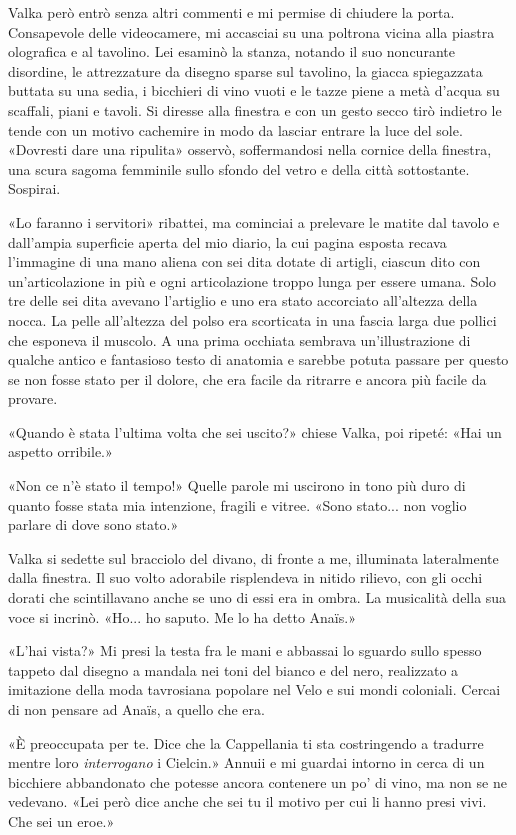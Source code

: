 Valka però entrò senza altri commenti e mi permise di chiudere la porta.
Consapevole delle videocamere, mi accasciai su una poltrona vicina alla
piastra olografica e al tavolino. Lei esaminò la stanza, notando il suo
noncurante disordine, le attrezzature da disegno sparse sul tavolino, la
giacca spiegazzata buttata su una sedia, i bicchieri di vino vuoti e le
tazze piene a metà d'acqua su scaffali, piani e tavoli. Si diresse alla
finestra e con un gesto secco tirò indietro le tende con un motivo
cachemire in modo da lasciar entrare la luce del sole. «Dovresti dare
una ripulita» osservò, soffermandosi nella cornice della finestra, una
scura sagoma femminile sullo sfondo del vetro e della città sottostante.
Sospirai.

«Lo faranno i servitori» ribattei, ma cominciai a prelevare le matite
dal tavolo e dall'ampia superficie aperta del mio diario, la cui pagina
esposta recava l'immagine di una mano aliena con sei dita dotate di
artigli, ciascun dito con un'articolazione in più e ogni articolazione
troppo lunga per essere umana. Solo tre delle sei dita avevano
l'artiglio e uno era stato accorciato all'altezza della nocca. La pelle
all'altezza del polso era scorticata in una fascia larga due pollici che
esponeva il muscolo. A una prima occhiata sembrava un'illustrazione di
qualche antico e fantasioso testo di anatomia e sarebbe potuta passare
per questo se non fosse stato per il dolore, che era facile da ritrarre
e ancora più facile da provare.

«Quando è stata l'ultima volta che sei uscito?» chiese Valka, poi
ripeté: «Hai un aspetto orribile.»

«Non ce n'è stato il tempo!» Quelle parole mi uscirono in tono più duro
di quanto fosse stata mia intenzione, fragili e vitree. «Sono stato...
non voglio parlare di dove sono stato.»

Valka si sedette sul bracciolo del divano, di fronte a me, illuminata
lateralmente dalla finestra. Il suo volto adorabile risplendeva in
nitido rilievo, con gli occhi dorati che scintillavano anche se uno di
essi era in ombra. La musicalità della sua voce si incrinò. «Ho... ho
saputo. Me lo ha detto Anaïs.»

«L'hai vista?» Mi presi la testa fra le mani e abbassai lo sguardo sullo
spesso tappeto dal disegno a mandala nei toni del bianco e del nero,
realizzato a imitazione della moda tavrosiana popolare nel Velo e sui
mondi coloniali. Cercai di non pensare ad Anaïs, a quello che era.

«È preoccupata per te. Dice che la Cappellania ti sta costringendo a
tradurre mentre loro \emph{interrogano} i Cielcin.» Annuii e mi guardai
intorno in cerca di un bicchiere abbandonato che potesse ancora
contenere un po' di vino, ma non se ne vedevano. «Lei però dice anche
che sei tu il motivo per cui li hanno presi vivi. Che sei un eroe.»

